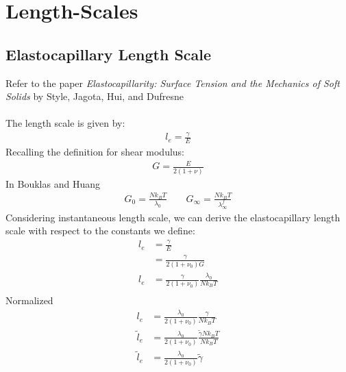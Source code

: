 \documentclass[12pt,3p]{article}
\numberwithin{equation}{section}
\begin{document}
\section{Length-Scales}

\subsection{Elastocapillary Length Scale}
Refer to the paper \textit{Elastocapillarity: Surface Tension and the Mechanics of Soft Solids} by Style, Jagota, Hui, and Dufresne \\ \\
The length scale is given by:
\begin{align}\label{elastocapLengthScale}
l_e = \frac{\gamma}{E} 
\end{align}
Recalling the definition for shear modulus: 
\begin{align*}
G = \frac{E}{2 (1 + \nu)}
\end{align*}
In Bouklas and Huang 
\begin{align*}
G_0 = \frac{N k_B T}{\lambda_0} \quad \quad G_\infty = \frac{N k_B T}{\lambda_{\infty}^f}
\end{align*}
Considering instantaneous length scale, we can derive the elastocapillary length scale with respect to the constants we define:
\begin{align*}
l_e &= \frac{\gamma}{E} \\
      &= \frac{\gamma}{2 (1 + \nu_0) G} \\
l_e &= \frac{\gamma}{2 (1 + \nu_0)} \frac{\lambda_0}{N k_B T} \\
\end{align*}
Normalized 
\begin{align*}
l_e &= \frac{\lambda_0}{2 (1 + \nu_0)} \frac{\gamma}{N k_B T} \\
\tilde{l}_e &= \frac{\lambda_0}{2 (1 + \nu_0)} \frac{\tilde{\gamma} N k_B T}{N k_B T} \\
\tilde{l}_e &= \frac{\lambda_0}{2 (1 + \nu_0)} \tilde{\gamma}\\
\end{align*}
\end{document}
